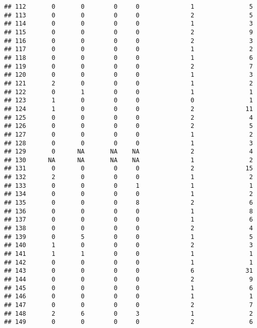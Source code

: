 \documentclass[
]{article}
\begin{document}
\begin{verbatim}
## 112       0       0        0     0              1               5
## 113       0       0        0     0              2               5
## 114       0       0        0     0              1               3
## 115       0       0        0     0              2               9
## 116       0       0        0     0              2               3
## 117       0       0        0     0              1               2
## 118       0       0        0     0              1               6
## 119       0       0        0     0              2               7
## 120       0       0        0     0              1               3
## 121       2       0        0     0              1               2
## 122       0       1        0     0              1               1
## 123       1       0        0     0              0               1
## 124       1       0        0     0              2              11
## 125       0       0        0     0              2               4
## 126       0       0        0     0              2               5
## 127       0       0        0     0              1               2
## 128       0       0        0     0              1               3
## 129       0      NA       NA    NA              2               4
## 130      NA      NA       NA    NA              1               2
## 131       0       0        0     0              2              15
## 132       2       0        0     0              1               2
## 133       0       0        0     1              1               1
## 134       0       0        0     0              1               2
## 135       0       0        0     8              2               6
## 136       0       0        0     0              1               8
## 137       0       0        0     0              1               6
## 138       0       0        0     0              2               4
## 139       0       5        0     0              1               5
## 140       1       0        0     0              2               3
## 141       1       1        0     0              1               1
## 142       0       0        0     0              1               1
## 143       0       0        0     0              6              31
## 144       0       0        0     0              2               9
## 145       0       0        0     0              1               6
## 146       0       0        0     0              1               1
## 147       0       0        0     0              2               7
## 148       2       6        0     3              1               2
## 149       0       0        0     0              2               6

\end{verbatim}
\end{document}
